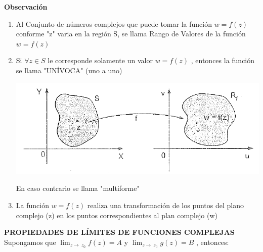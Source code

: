 \documentclass[10pt,a4paper]{book}
\begin{document}
  \textbf{Observación}
  \begin{enumerate}
   \item Al Conjunto de números complejos que puede tomar la función $w=f(z)$ conforme "z" varia en la región S, se llama      Rango de Valores de la función $w=f(z)$
   \item Si $\forall z \in S$ le corresponde solamente un valor $w=f(z)$ , entonces la función se llama "UNÍVOCA" (uno a uno) \\ \begin{center}
    \includegraphics[scale=0.6]{univoca.png}
   \end{center}
   En caso contrario se llama "multiforme"
   \item La función $w=f(z)$ realiza una transformación de los puntos del plano complejo (z) en los puntos correspondientes al plan complejo (w)
  \end{enumerate}     
\textbf{PROPIEDADES DE LÍMITES DE FUNCIONES COMPLEJAS} \\
Supongamos que $ \lim_{z\to\ z_0} f(z)=A$ y $ \lim_{z\to\ z_0} g(z)=B$ , entonces: \\
\end{document}
